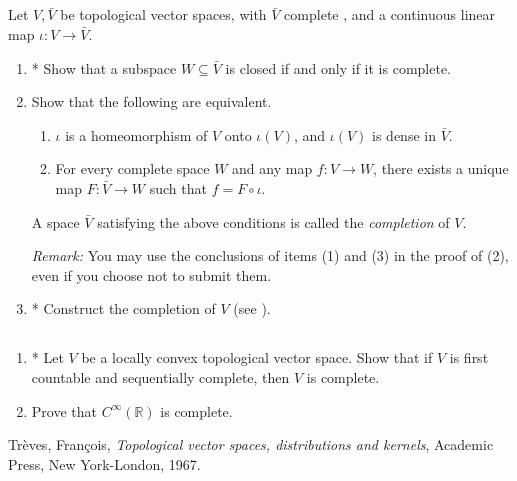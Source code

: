 \documentclass[11pt, reqno,a4paper, twoside]{amsproc}
\newcommand{\dbR}{\mathbb R}
\newcommand{\lctvs}{locally convex topological vector space}
\begin{document}
\subsection{}
Let $V,\bar{V}$ be topological vector spaces, with $\bar{V}$ complete , and a continuous linear map $\iota:V\to \bar{V}$. 
\begin{enumerate}
	\item * Show that a subspace $W\subseteq \bar{V}$ is closed if and only if it is complete.
	\item 	Show that the following are equivalent.
	\begin{enumerate}
		\item $\iota$ is a homeomorphism of $V$ onto $\iota(V)$, and $\iota(V)$ is dense in $\bar{V}$.
		\item For every complete space $W$ and any map $f:V\to W$, there exists a unique map $F:\bar{V}\to W$ such that $f=F\circ \iota$. 
	\end{enumerate}
	A space $\bar{V}$ satisfying the above conditions is called the \textit{completion} of $V$. 
	
	\textit{Remark:} You may use the conclusions of items (1) and (3) in the proof of (2), even if you choose not to submit them.
	\item * Construct the completion of $V$ (see \cite[Theorem 5.2]{treves}).
\end{enumerate}

\subsection{}
\begin{enumerate}
	\item* Let $V$ be a \lctvs. Show that if $V$ is first countable and sequentially complete, then $V$ is complete.
	\item Prove that $C^{\infty}(\dbR)$ is complete. 
\end{enumerate}


\begin{thebibliography}{10}
Tr\`eves, Fran\c{c}ois,\textit{ Topological vector spaces, distributions and kernels}, Academic Press, New York-London, {1967}.
\end{thebibliography}
\end{document}
